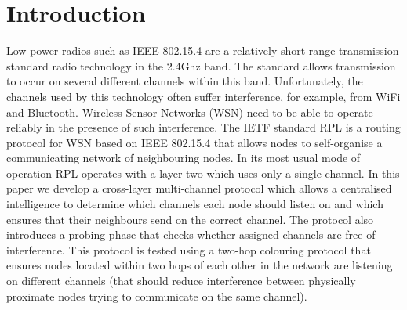 \section{Introduction}
\label{sec:introduction}

Low power radios such as IEEE 802.15.4 are a relatively short range transmission standard radio technology in the 2.4Ghz band.  The standard allows transmission to occur on several different channels within this band.  Unfortunately, the
channels used by this technology often suffer interference, for example, from WiFi and Bluetooth.  Wireless Sensor Networks (WSN) need to be
able to operate reliably in the presence of such interference.  The IETF standard RPL is a routing protocol for WSN based on IEEE 802.15.4 that allows nodes to self-organise a communicating network of neighbouring nodes.  In
its most usual mode of operation RPL operates with a layer two which uses only a single channel.  In this paper we develop a cross-layer multi-channel
protocol which allows a centralised intelligence to determine which channels each node should listen on and which ensures that their neighbours send on the correct channel.  The protocol also introduces a probing phase that checks whether assigned channels are free of interference.  This protocol is tested using a two-hop colouring protocol that ensures nodes located within two hops of each other in the network are listening on different channels (that should reduce interference between physically proximate nodes trying to communicate on the same channel).  


